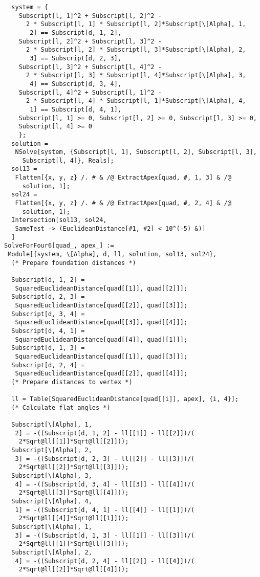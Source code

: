 \documentclass[../main.tex]{subfiles}
\begin{document}
\begin{lstlisting}
  system = {
    Subscript[l, 1]^2 + Subscript[l, 2]^2 -
      2 * Subscript[l, 1] * Subscript[l, 2]*Subscript[\[Alpha], 1,
       2] == Subscript[d, 1, 2],
    Subscript[l, 2]^2 + Subscript[l, 3]^2 -
      2 * Subscript[l, 2] * Subscript[l, 3]*Subscript[\[Alpha], 2,
       3] == Subscript[d, 2, 3],
    Subscript[l, 3]^2 + Subscript[l, 4]^2 -
      2 * Subscript[l, 3] * Subscript[l, 4]*Subscript[\[Alpha], 3,
       4] == Subscript[d, 3, 4],
    Subscript[l, 4]^2 + Subscript[l, 1]^2 -
      2 * Subscript[l, 4] * Subscript[l, 1]*Subscript[\[Alpha], 4,
       1] == Subscript[d, 4, 1],
    Subscript[l, 1] >= 0, Subscript[l, 2] >= 0, Subscript[l, 3] >= 0,
    Subscript[l, 4] >= 0
    };
  solution =
   NSolve[system, {Subscript[l, 1], Subscript[l, 2], Subscript[l, 3],
     Subscript[l, 4]}, Reals];
  sol13 =
   Flatten[{x, y, z} /. # & /@ ExtractApex[quad, #, 1, 3] & /@
     solution, 1];
  sol24 =
   Flatten[{x, y, z} /. # & /@ ExtractApex[quad, #, 2, 4] & /@
     solution, 1];
  Intersection[sol13, sol24,
   SameTest -> (EuclideanDistance[#1, #2] < 10^(-5) &)]
  ]
SolveForFour6[quad_, apex_] :=
 Module[{system, \[Alpha], d, ll, solution, sol13, sol24},
  (* Prepare foundation distances *)

  Subscript[d, 1, 2] =
   SquaredEuclideanDistance[quad[[1]], quad[[2]]];
  Subscript[d, 2, 3] =
   SquaredEuclideanDistance[quad[[2]], quad[[3]]];
  Subscript[d, 3, 4] =
   SquaredEuclideanDistance[quad[[3]], quad[[4]]];
  Subscript[d, 4, 1] =
   SquaredEuclideanDistance[quad[[4]], quad[[1]]];
  Subscript[d, 1, 3] =
   SquaredEuclideanDistance[quad[[1]], quad[[3]]];
  Subscript[d, 2, 4] =
   SquaredEuclideanDistance[quad[[2]], quad[[4]]];
  (* Prepare distances to vertex *)

  ll = Table[SquaredEuclideanDistance[quad[[i]], apex], {i, 4}];
  (* Calculate flat angles *)

  Subscript[\[Alpha], 1,
   2] = -((Subscript[d, 1, 2] - ll[[1]] - ll[[2]])/(
    2*Sqrt@ll[[1]]*Sqrt@ll[[2]]));
  Subscript[\[Alpha], 2,
   3] = -((Subscript[d, 2, 3] - ll[[2]] - ll[[3]])/(
    2*Sqrt@ll[[2]]*Sqrt@ll[[3]]));
  Subscript[\[Alpha], 3,
   4] = -((Subscript[d, 3, 4] - ll[[3]] - ll[[4]])/(
    2*Sqrt@ll[[3]]*Sqrt@ll[[4]]));
  Subscript[\[Alpha], 4,
   1] = -((Subscript[d, 4, 1] - ll[[4]] - ll[[1]])/(
    2*Sqrt@ll[[4]]*Sqrt@ll[[1]]));
  Subscript[\[Alpha], 1,
   3] = -((Subscript[d, 1, 3] - ll[[1]] - ll[[3]])/(
    2*Sqrt@ll[[1]]*Sqrt@ll[[3]]));
  Subscript[\[Alpha], 2,
   4] = -((Subscript[d, 2, 4] - ll[[2]] - ll[[4]])/(
    2*Sqrt@ll[[2]]*Sqrt@ll[[4]]));


\end{lstlisting}
\end{document}

